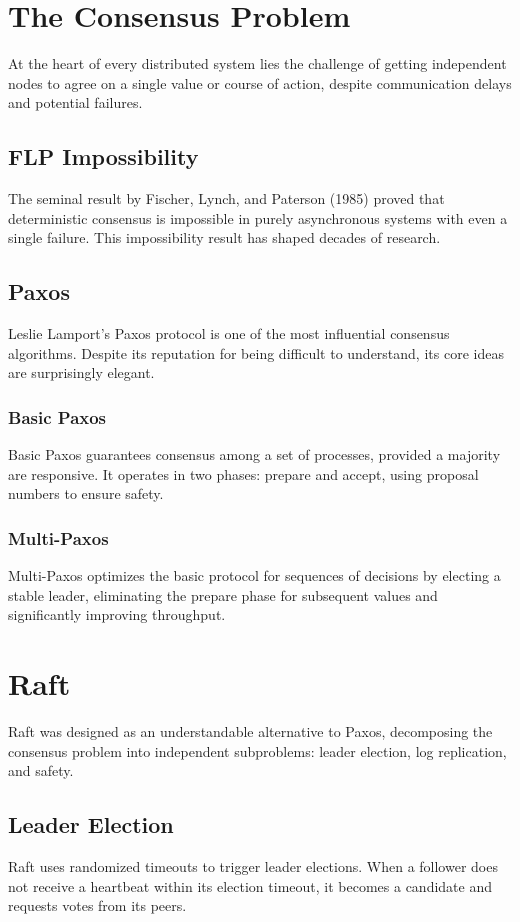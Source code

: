 \documentclass[12pt]{article}
\begin{document}
\section{The Consensus Problem}
At the heart of every distributed system lies the challenge of getting
independent nodes to agree on a single value or course of action, despite
communication delays and potential failures.

\subsection{FLP Impossibility}
The seminal result by Fischer, Lynch, and Paterson (1985) proved that
deterministic consensus is impossible in purely asynchronous systems
with even a single failure. This impossibility result has shaped decades
of research.

\subsection{Paxos}
Leslie Lamport's Paxos protocol is one of the most influential consensus
algorithms. Despite its reputation for being difficult to understand,
its core ideas are surprisingly elegant.

\subsubsection{Basic Paxos}
Basic Paxos guarantees consensus among a set of processes, provided a
majority are responsive. It operates in two phases: prepare and accept,
using proposal numbers to ensure safety.

\subsubsection{Multi-Paxos}
Multi-Paxos optimizes the basic protocol for sequences of decisions by
electing a stable leader, eliminating the prepare phase for subsequent
values and significantly improving throughput.

\section{Raft}
Raft was designed as an understandable alternative to Paxos, decomposing
the consensus problem into independent subproblems: leader election,
log replication, and safety.

\subsection{Leader Election}
Raft uses randomized timeouts to trigger leader elections. When a follower
does not receive a heartbeat within its election timeout, it becomes a
candidate and requests votes from its peers.
\end{document}
